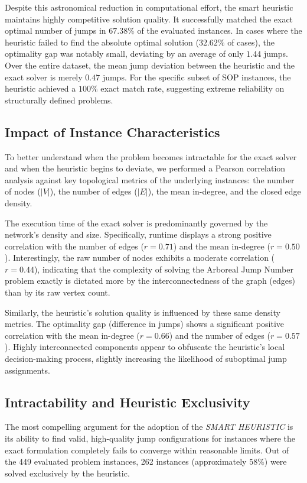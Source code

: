 Despite this astronomical reduction in computational effort, the smart heuristic maintains highly competitive solution quality. It successfully matched the exact optimal number of jumps in $67.38\%$ of the evaluated instances. In cases where the heuristic failed to find the absolute optimal solution ($32.62\%$ of cases), the optimality gap was notably small, deviating by an average of only $1.44$ jumps. Over the entire dataset, the mean jump deviation between the heuristic and the exact solver is merely $0.47$ jumps. For the specific subset of SOP instances, the heuristic achieved a $100\%$ exact match rate, suggesting extreme reliability on structurally defined problems.

\subsection{Impact of Instance Characteristics}

To better understand when the problem becomes intractable for the exact solver and when the heuristic begins to deviate, we performed a Pearson correlation analysis against key topological metrics of the underlying instances: the number of nodes ($|V|$), the number of edges ($|E|$), the mean in-degree, and the closed edge density.

The execution time of the exact solver is predominantly governed by the network's density and size. Specifically, runtime displays a strong positive correlation with the number of edges ($r = 0.71$) and the mean in-degree ($r = 0.50$). Interestingly, the raw number of nodes exhibits a moderate correlation ($r = 0.44$), indicating that the complexity of solving the Arboreal Jump Number problem exactly is dictated more by the interconnectedness of the graph (edges) than by its raw vertex count.

Similarly, the heuristic's solution quality is influenced by these same density metrics. The optimality gap (difference in jumps) shows a significant positive correlation with the mean in-degree ($r = 0.66$) and the number of edges ($r = 0.57$). Highly interconnected components appear to obfuscate the heuristic's local decision-making process, slightly increasing the likelihood of suboptimal jump assignments.

\subsection{Intractability and Heuristic Exclusivity}

The most compelling argument for the adoption of the \textit{SMART HEURISTIC} is its ability to find valid, high-quality jump configurations for instances where the exact formulation completely fails to converge within reasonable limits. Out of the 449 evaluated problem instances, 262 instances (approximately $58\%$) were solved exclusively by the heuristic. 

